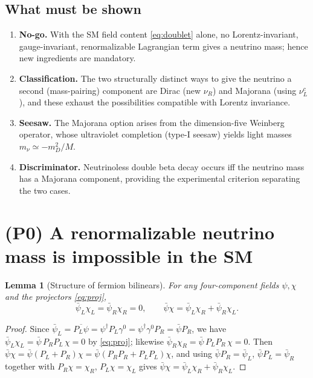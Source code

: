 \documentclass[12pt]{article}
\newtheorem{lemma}{Lemma}
\theoremstyle{definition}
\newcommand{\nuL}{\nu_L}
\newcommand{\nuR}{\nu_R}
\newcommand{\PL}{P_L}
\newcommand{\PR}{P_R}
\begin{document}
\subsection{What must be shown}
\begin{enumerate}
\item[(P0)] \textbf{No-go.} With the SM field content
\eqref{eq:doublet} alone, no Lorentz-invariant, gauge-invariant,
renormalizable Lagrangian term gives a neutrino mass; hence new
ingredients are mandatory.
\item[(P1)] \textbf{Classification.} The two structurally distinct ways
to give the neutrino a second (mass-pairing) component are Dirac (new
$\nuR$) and Majorana (using $\nuL^c$), and these exhaust the possibilities
compatible with Lorentz invariance.
\item[(P2)] \textbf{Seesaw.} The Majorana option arises from the
dimension-five Weinberg operator, whose ultraviolet completion (type-I
seesaw) yields light masses $m_\nu\simeq -m_D^2/M$.
\item[(P3)] \textbf{Discriminator.} Neutrinoless double beta decay occurs
iff the neutrino mass has a Majorana component, providing the
experimental criterion separating the two cases.
\end{enumerate}

\section{(P0) A renormalizable neutrino mass is impossible in the SM}

\begin{lemma}[Structure of fermion bilinears]\label{lem:bilinear}
For any four-component fields $\psi,\chi$ and the projectors
\eqref{eq:proj},
\begin{equation}\label{eq:cross}
\bar\psi_L\chi_L=\bar\psi_R\chi_R=0,\qquad
\bar\psi\chi=\bar\psi_L\chi_R+\bar\psi_R\chi_L .
\end{equation}
\end{lemma}
\begin{proof}
Since $\bar\psi_L=\overline{\PL\psi}
=\psi^\dagger\PL\gamma^0=\psi^\dagger\gamma^0\PR=\bar\psi\PR$,
we have $\bar\psi_L\chi_L=\bar\psi\,\PR\PL\,\chi=0$ by \eqref{eq:proj};
likewise $\bar\psi_R\chi_R=\bar\psi\,\PL\PR\,\chi=0$. Then
$\bar\psi\chi=\bar\psi(\PL+\PR)\chi
=\bar\psi(\PR\PR+\PL\PL)\chi$, and using
$\bar\psi\PR=\bar\psi_L$, $\bar\psi\PL=\bar\psi_R$ together with
$\PR\chi=\chi_R$, $\PL\chi=\chi_L$ gives
$\bar\psi\chi=\bar\psi_L\chi_R+\bar\psi_R\chi_L$.
\end{proof}
\end{document}

